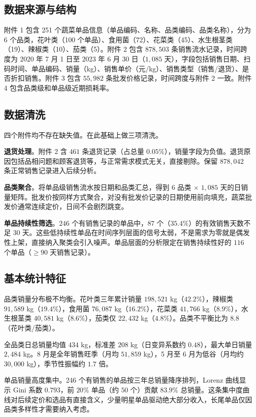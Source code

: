 \subsection{数据来源与结构}

附件 1 包含 251 个蔬菜单品信息（单品编码、名称、品类编码、品类名称），分为 6 个品类，花叶类（100 个单品）、食用菌（72）、花菜类（45）、水生根茎类（19）、辣椒类（10）、茄类（5）。附件 2 包含 $878,503$ 条销售流水记录，时间跨度为 2020 年 7 月 1 日至 2023 年 6 月 30 日（$1,085$ 天），字段包括销售日期、扫码时间、单品编码、销量（kg）、销售单价（元/kg）、销售类型（销售/退货）、是否折扣销售。附件 3 包含 $55,982$ 条批发价格记录，时间跨度与附件 2 一致。附件 4 包含品类级和单品级近期损耗率。

\subsection{数据清洗}

四个附件均不存在缺失值。在此基础上做三项清洗。

\textbf{退货处理}。附件 2 含 $461$ 条退货记录（占总量 $0.05\%$），销量字段为负值。退货原因包括品相问题和顾客退货等，与正常需求模式无关，直接剔除。保留 $878,042$ 条正常销售记录进入后续分析。

\textbf{品类聚合}。将单品级销售流水按日期和品类汇总，得到 $6$ 品类 $\times$ $1,085$ 天的日销量矩阵。批发价按同样方式聚合，对没有批发价记录的日期使用前向填充，蔬菜批发价通常连续定价，日间不会剧烈跳变。

\textbf{单品持续性筛选}。$246$ 个有销售记录的单品中，$87$ 个（$35.4\%$）的有效销售天数不足 $30$ 天。这些低持续性单品在时间序列层面的信号太弱，不是需求为零就是偶发性上架，直接纳入聚类会引入噪声。单品层面的分析限定在销售持续性好的 $116$ 个单品（$\geq 90$ 天销售记录）。

\subsection{基本统计特征}

品类销量分布极不均衡。花叶类三年累计销量 $198,521$ kg（$\mathbf{42.2\%}$），辣椒类 $91,589$ kg（$\mathbf{19.4\%}$），食用菌 $76,087$ kg（$16.2\%$），花菜类 $41,766$ kg（$8.9\%$），水生根茎类 $40,581$ kg（$8.6\%$），茄类仅 $22,432$ kg（$\mathbf{4.8\%}$）。品类不平衡比为 $8.8$（花叶类/茄类）。

全品类日总销量均值 $434$ kg，标准差 $208$ kg（日变异系数约 $0.48$），最大单日销量 $2,484$ kg。8 月是全年销售旺季（月均 $51,859$ kg），5 月至 6 月为低谷（月均约 $30,000$ kg），季节性振幅约 $1.7$ 倍。

单品销量高度集中。246 个有销售的单品按三年总销量降序排列，Lorenz 曲线显示 Gini 系数 $\mathbf{0.793}$，前 $20\%$ 单品（约 $50$ 个）贡献 $83.9\%$ 总销量。这条集中度曲线对后续定价和选品有直接含义，少量明星单品驱动绝大部分收入，长尾单品仅因品类多样性才需要纳入考虑。
